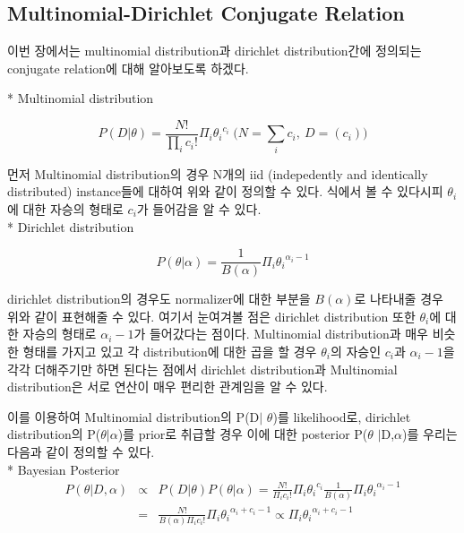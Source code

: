 \documentclass[a4paper]{oblivoir}
\begin{document}
\subsection{Multinomial-Dirichlet Conjugate Relation}
이번 장에서는  multinomial distribution과 dirichlet distribution간에 정의되는 conjugate relation에 대해 알아보도록 하겠다. 

* Multinomial distribution

\begin{equation}
P(D|\theta) = \frac{N!}{\prod_{i} c_{i}!}\Pi_{i}{\theta_{i}}^{c_{i}} \; \Big(N = \sum_{i}c_{i}, ~ D=(c_{i}) \Big)
\end{equation}

먼저 Multinomial distribution의 경우 N개의 iid (indepedently and identically distributed) instance들에 대하여 위와 같이 정의할 수 있다. 식에서 볼 수 있다시피 $\theta_{i}$에 대한 자승의 형태로 $c_{i}$가 들어감을 알 수 있다.\\

* Dirichlet distribution

\begin{equation}
P(\theta|\alpha) = \frac{1}{B(\alpha)}\Pi_{i}{\theta_{i}}^{\alpha_{i}-1}
\end{equation}

dirichlet distribution의 경우도 normalizer에 대한 부분을 $B(\alpha)$로 나타내줄 경우 위와 같이 표현해줄 수 있다. 여기서 눈여겨볼 점은 dirichlet distribution 또한  $\theta_{i}$에 대한 자승의 형태로 $\alpha_{i}-1$가 들어갔다는 점이다. Multinomial distribution과 매우 비슷한 형태를 가지고 있고 각 distribution에 대한 곱을 할 경우 $\theta_{i}$의 자승인 $c_{i}$과 $\alpha_{i}-1$을 각각 더해주기만 하면 된다는 점에서 dirichlet distribution과 Multinomial distribution은 서로 연산이 매우 편리한 관계임을 알 수 있다.

이를 이용하여 Multinomial distribution의 P(D$|$ $\theta$)를 likelihood로, dirichlet distribution의 P($\theta$$|$$\alpha$)를 prior로 취급할 경우 이에 대한 posterior P($\theta$ $|$D,$\alpha$)를 우리는 다음과 같이 정의할 수 있다.\\

* Bayesian Posterior
\begin{eqnarray}
P(\theta|D,\alpha) & \propto &  P(D|\theta)P(\theta|\alpha) = \frac{N!}{\Pi_{i} c_{i}!}\Pi_{i}{\theta_{i}}^{c_{i}}\frac{1}{B(\alpha)}\Pi_{i}{\theta_{i}}^{\alpha_{i}-1}\nonumber \\
& = & \frac{N!}{B(\alpha)\Pi_{i}c_{i}!}\Pi_{i}
{\theta_{i}}^{\alpha_{i}+c_{i}-1} \propto \Pi_{i}
{\theta_{i}}^{\alpha_{i}+c_{i}-1}
\end{eqnarray}
\end{document}
